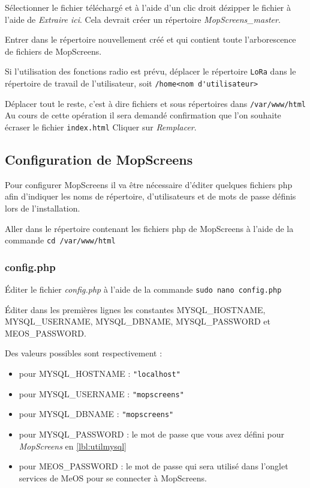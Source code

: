 \documentclass[a4paper]{ffco-rapport}
\begin{document}
		Sélectionner le fichier téléchargé et à l'aide d'un clic droit dézipper le fichier à l'aide de \emph{Extraire ici}. Cela devrait créer un répertoire \emph{MopScreens\_master}.
		
		Entrer dans le répertoire nouvellement créé et qui contient toute l'arborescence de fichiers de MopScreens.
		
		Si l'utilisation des fonctions radio est prévu, déplacer le répertoire \verb|LoRa| dans le répertoire de travail de l'utilisateur, soit \verb|/home<nom d'utilisateur>|
		
		Déplacer tout le reste, c'est à dire fichiers et sous répertoires dans \verb|/var/www/html| Au cours de cette opération il sera demandé confirmation que l'on souhaite écraser le fichier \verb|index.html| Cliquer sur \emph{Remplacer}.
		
	\subsection{Configuration de MopScreens}
		Pour configurer MopScreens il va être nécessaire d'éditer quelques fichiers php afin d'indiquer les noms de répertoire, d'utilisateurs et de mots de passe définis lors de l'installation.

		Aller dans le répertoire contenant les fichiers php de MopScreens à l'aide de la commande \verb|cd /var/www/html|
		\subsubsection{config.php}
		Éditer le fichier \emph{config.php} à l'aide de la commande \verb|sudo nano config.php|
		
		Éditer dans les premières lignes les constantes MYSQL\_HOSTNAME, MYSQL\_USERNAME, MYSQL\_DBNAME, MYSQL\_PASSWORD et MEOS\_PASSWORD.
		
		Des valeurs possibles sont respectivement :
		
		\begin{itemize}
			\item pour MYSQL\_HOSTNAME : \texttt{"localhost"}
			\item pour MYSQL\_USERNAME : \texttt{"mopscreens"}
			\item pour MYSQL\_DBNAME : \texttt{"mopscreens"}
			\item pour MYSQL\_PASSWORD : le mot de passe que vous avez défini pour \emph{MopScreens} en \ref{lbl:utilmysql}
			\item pour MEOS\_PASSWORD : le mot de passe qui sera utilisé dans l'onglet \og{}services\fg{} de MeOS pour se connecter à MopScreens.
		\end{itemize}
		
\end{document}
